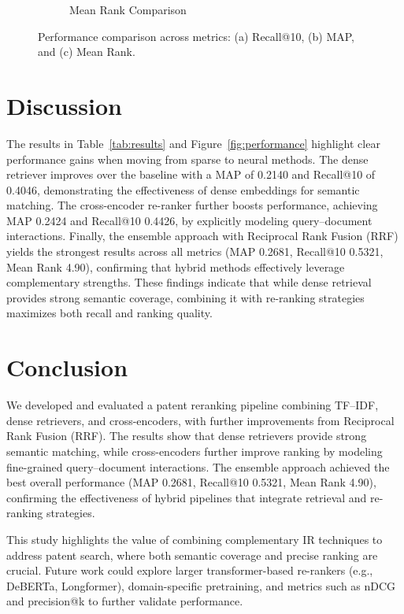 \documentclass[11pt,a4paper]{article}
\begin{document}
\begin{figure}[H]
\begin{subfigure}{0.32\linewidth}
        \caption{Mean Rank Comparison}
    \end{subfigure}
    \caption{Performance comparison across metrics: (a) Recall@10, (b) MAP, and (c) Mean Rank.}
    \label{fig:perf-comparison}
\end{figure}

\section{Discussion}
The results in Table~\ref{tab:results} and Figure~\ref{fig:performance} highlight clear performance gains when moving from sparse to neural methods. 
The dense retriever improves over the baseline with a MAP of 0.2140 and Recall@10 of 0.4046, demonstrating the effectiveness of dense embeddings for semantic matching. 
The cross-encoder re-ranker further boosts performance, achieving MAP 0.2424 and Recall@10 0.4426, by explicitly modeling query--document interactions. 
Finally, the ensemble approach with Reciprocal Rank Fusion (RRF) yields the strongest results across all metrics (MAP 0.2681, Recall@10 0.5321, Mean Rank 4.90), confirming that hybrid methods effectively leverage complementary strengths. 
These findings indicate that while dense retrieval provides strong semantic coverage, combining it with re-ranking strategies maximizes both recall and ranking quality.

\section{Conclusion}
We developed and evaluated a patent reranking pipeline combining TF--IDF, dense retrievers, and cross-encoders, with further improvements from Reciprocal Rank Fusion (RRF). 
The results show that dense retrievers provide strong semantic matching, while cross-encoders further improve ranking by modeling fine-grained query--document interactions. 
The ensemble approach achieved the best overall performance (MAP 0.2681, Recall@10 0.5321, Mean Rank 4.90), confirming the effectiveness of hybrid pipelines that integrate retrieval and re-ranking strategies. 

This study highlights the value of combining complementary IR techniques to address patent search, where both semantic coverage and precise ranking are crucial. 
Future work could explore larger transformer-based re-rankers (e.g., DeBERTa, Longformer), domain-specific pretraining, and metrics such as nDCG and precision@k to further validate performance.



\end{document}
